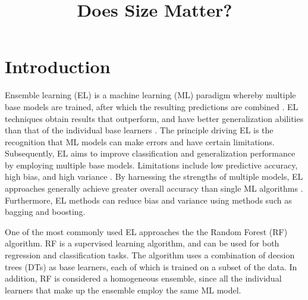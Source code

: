 \documentclass[conference]{IEEEtran}
\begin{document}
\title{Does Size Matter?}

\author{
}

\maketitle

\begin{abstract}

\end{abstract}

\section{Introduction}

    Ensemble learning (EL) is a machine learning (ML) paradigm whereby multiple base models are trained, after which the resulting
    predictions are combined \cite{mienye2022survey,naderalvojoud2024improving}. EL techniques obtain results that outperform,
    and have better generalization abilities than that of the individual base learners \cite{zhou2021formulating}. The principle
    driving EL is the recognition that ML models can make errors and have certain limitations. Subsequently, EL aims to improve
    classification and generalization performance by employing multiple base models. Limitations include low predictive accuracy,
    high bias, and high variance \cite{mishra2022improving,sun2021classifier}. By harnessing the strengths of multiple models,
    EL approaches generally achieve greater overall accuracy than single ML algorithms \cite{brown2011ensemble}. Furthermore,
    EL methods can reduce bias and variance using methods such as bagging and boosting. 
    
    One of the most commonly used EL approaches the the Random Forest (RF) algorithm. RF is a supervised learning algorithm, and
    can be used for both regression and classification tasks. The algorithm uses a combination of decsion trees (DTs) as base learners,
    each of which is trained on a subset of the data. In addition, RF is considered a homogeneous ensemble, since all the
    individual learners that make up the ensemble employ the same ML model.
\end{document}
